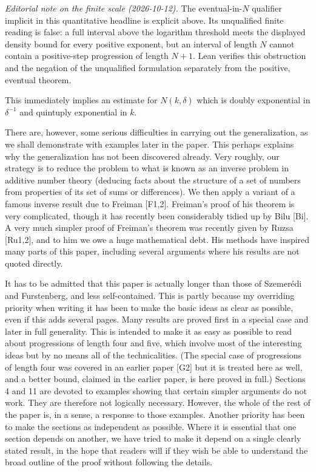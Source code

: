 \documentclass[10pt]{article}
\begin{document}
\emph{Editorial note on the finite scale (2026-10-12).}
The eventual-in-$N$ qualifier implicit in this quantitative headline is
explicit above. Its unqualified finite reading is false: a full interval
above the logarithm threshold meets the displayed density bound for every
positive exponent, but an interval of length $N$ cannot contain a
positive-step progression of length $N+1$. Lean verifies this obstruction
and the negation of the unqualified formulation separately from the
positive, eventual theorem.

This immediately implies an estimate for $N(k, \delta)$ which is doubly exponential in $\delta^{-1}$ and quintuply exponential in $k$.

There are, however, some serious difficulties in carrying out the generalization, as we shall demonstrate with examples later in the paper. This perhaps explains why the generalization has not been discovered already. Very roughly, our strategy is to reduce the problem to what is known as an inverse problem in additive number theory (deducing facts about the structure of a set of numbers from properties of its set of sums or differences). We then apply a variant of a famous inverse result due to Freiman [F1,2]. Freiman's proof of his theorem is very complicated, though it has recently been considerably tidied up by Bilu [Bi]. A very much simpler proof of Freiman's theorem was recently given by Ruzsa [Ru1,2], and to him we owe a huge mathematical debt. His methods have inspired many parts of this paper, including several arguments where his results are not quoted directly.

It has to be admitted that this paper is actually longer than those of Szemerédi and Furstenberg, and less self-contained. This is partly because my overriding priority when writing it has been to make the basic ideas as clear as possible, even if this adds several pages. Many results are proved first in a special case and later in full generality. This is intended to make it as easy as possible to read about progressions of length four and five, which involve most of the interesting ideas but by no means all of the technicalities. (The special case of progressions of length four was covered in an earlier paper [G2] but it is treated here as well, and a better bound, claimed in the earlier paper, is here proved in full.) Sections 4 and 11 are devoted to examples showing that certain simpler arguments do not work. They are therefore not logically necessary. However, the whole of the rest of the paper is, in a sense, a response to those examples. Another priority has been to make the sections as independent as possible. Where it is essential that one section depends on another, we have tried to make it depend on a single clearly stated result, in the hope that readers will if they wish be able to understand the broad outline of the proof without following the details.
\end{document}
